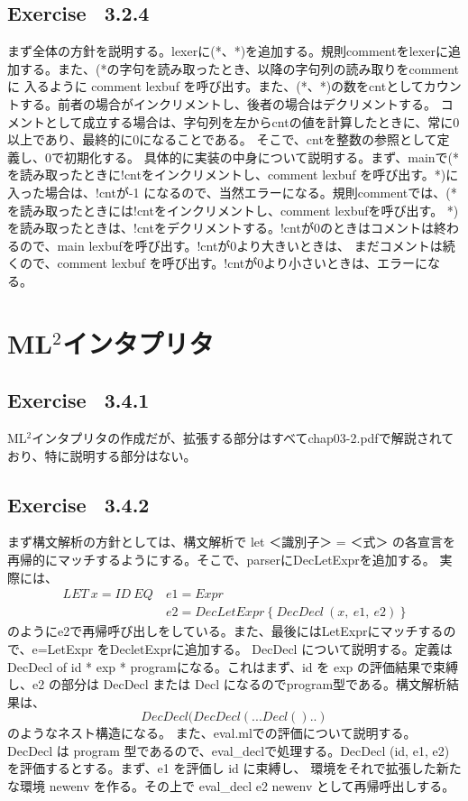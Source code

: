 \documentclass{jreport}
\begin{document}
		\section{Exercise \ 3.2.4}
			まず全体の方針を説明する。lexerに(*、*)を追加する。規則commentをlexerに追加する。また、(*の字句を読み取ったとき、以降の字句列の読み取りをcommentに
			入るように comment lexbuf を呼び出す。また、(*、*)の数をcntとしてカウントする。前者の場合がインクリメントし、後者の場合はデクリメントする。
			コメントとして成立する場合は、字句列を左からcntの値を計算したときに、常に0以上であり、最終的に0になることである。
			そこで、cntを整数の参照として定義し、0で初期化する。
			具体的に実装の中身について説明する。まず、mainで(*を読み取ったときに!cntをインクリメントし、comment lexbuf を呼び出す。*)に入った場合は、!cntが-1
			になるので、当然エラーになる。規則commentでは、(*を読み取ったときには!cntをインクリメントし、comment lexbufを呼び出す。
			*)を読み取ったときは、!cntをデクリメントする。!cntが0のときはコメントは終わるので、main lexbufを呼び出す。!cntが0より大きいときは、
			まだコメントは続くので、comment lexbuf を呼び出す。!cntが0より小さいときは、エラーになる。
	\chapter{ML$^2$インタプリタ}
		\section{Exercise \ 3.4.1}
			ML$^2$インタプリタの作成だが、拡張する部分はすべてchap03-2.pdfで解説されており、特に説明する部分はない。
		\section{Exercise \ 3.4.2}
			まず構文解析の方針としては、構文解析で let ＜識別子＞ = ＜式＞ の各宣言を再帰的にマッチするようにする。そこで、parserにDecLetExprを追加する。
			実際には、
\begin{equation}
	\begin{split}
		LET \ x=ID \ EQ \ &e1=Expr \ \\ &e2=DecLetExpr \ \{ \ DecDecl \ (x, \ e1, \ e2) \ \}
	\end{split}
\end{equation}
			のようにe2で再帰呼び出しをしている。また、最後にはLetExprにマッチするので、e=LetExpr をDecletExprに追加する。
			DecDecl について説明する。定義はDecDecl of id * exp * programになる。これはまず、id を exp の評価結果で束縛し、e2 の部分は
			DecDecl または Decl になるのでprogram型である。構文解析結果は、
\begin{equation}DecDecl(DecDecl(...Decl()..)\end{equation}のようなネスト構造になる。
			また、eval.mlでの評価について説明する。
			DecDecl は program 型であるので、eval\_declで処理する。DecDecl (id, e1, e2) を評価するとする。まず、e1 を評価し id に束縛し、
			環境をそれで拡張した新たな環境 newenv を作る。その上で eval\_decl e2 newenv として再帰呼出しする。
\end{document}
